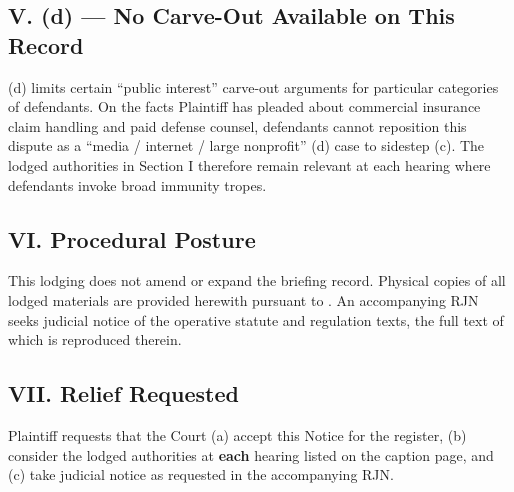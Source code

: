 \subsection*{V. (d) --- No Carve-Out Available on This Record}

(d) limits certain ``public interest'' carve-out arguments for particular categories of defendants. On the facts Plaintiff has pleaded about commercial insurance claim handling and paid defense counsel, defendants cannot reposition this dispute as a ``media / internet / large nonprofit'' (d) case to sidestep (c). The lodged authorities in Section I therefore remain relevant at each hearing where defendants invoke broad  immunity tropes.

\subsection*{VI. Procedural Posture}

This lodging does not amend or expand the briefing record. Physical copies of all lodged materials are provided herewith pursuant to . An accompanying RJN seeks judicial notice of the operative statute and regulation texts, the full text of which is reproduced therein.

\subsection*{VII. Relief Requested}

Plaintiff requests that the Court (a) accept this Notice for the register, (b) consider the lodged authorities at \textbf{each} hearing listed on the caption page, and (c) take judicial notice as requested in the accompanying RJN.



